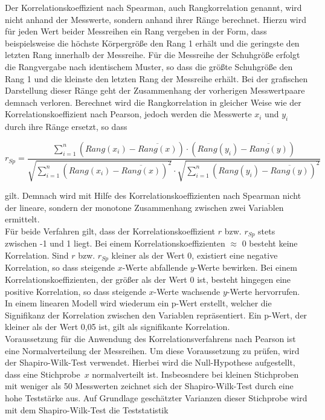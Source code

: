 Der Korrelationskoeffizient nach Spearman, auch Rangkorrelation genannt, wird nicht anhand der Messwerte, sondern anhand ihrer Ränge berechnet. Hierzu wird für jeden Wert beider Messreihen ein Rang vergeben in der Form, dass beispielsweise die höchste Körpergröße den Rang 1 erhält und die geringste den letzten Rang innerhalb der Messreihe. Für die Messreihe der Schuhgröße erfolgt die Rangvergabe nach identischem Muster, so dass die größte Schuhgröße den Rang 1 und die kleinste den letzten Rang der Messreihe erhält. Bei der grafischen Darstellung dieser Ränge geht der Zusammenhang der vorherigen Messwertpaare demnach verloren. Berechnet wird die Rangkorrelation in gleicher Weise wie der Korrelationskoeffizient nach Pearson, jedoch werden die Messwerte $x_i$ und $y_i$ durch ihre Ränge ersetzt, so dass 

\begin{equation}
r_{Sp} =  \frac{\sum \limits_{i=1}^n (Rang(x_i)-\overline{Rang(x)}) \cdot (Rang(y_i)-\overline{Rang(y)})}{\sqrt{\sum \limits_{i=1}^n (Rang(x_i)-\overline{Rang(x)})^2} \cdot \sqrt{\sum \limits_{i=1}^n (Rang(y_i)-\overline{Rang(y)})^2}}
	\label{eq:spearman}
\end{equation}

gilt. Demnach wird mit Hilfe des Korrelationskoeffizienten nach Spearman nicht der lineare, sondern der monotone Zusammenhang zwischen zwei Variablen ermittelt. \parencite{frank_einfach_2006}\\

Für beide Verfahren gilt, dass der Korrelationskoeffizient $r$ bzw. $r_{Sp}$ stets zwischen -1 und 1 liegt. Bei einem Korrelationskoeffizienten $\approx$ 0 besteht keine Korrelation. Sind $r$ bzw. $r_{Sp}$ kleiner als der Wert 0, existiert eine negative Korrelation, so dass steigende $x$-Werte abfallende $y$-Werte bewirken. Bei einem Korrelationskoeffizienten, der größer als der Wert 0 ist, besteht hingegen eine positive Korrelation, so dass steigende $x$-Werte wachsende $y$-Werte hervorrufen. In einem linearen Modell wird wiederum ein p-Wert erstellt, welcher die Signifikanz der Korrelation zwischen den Variablen repräsentiert. Ein p-Wert, der kleiner als der Wert 0,05 ist, gilt als signifikante Korrelation. \parencite{frank_einfach_2006}\\

Voraussetzung für die Anwendung des Korrelationsverfahrens nach Pearson ist eine Normalverteilung der Messreihen. Um diese Voraussetzung zu prüfen, wird der Shapiro-Wilk-Test verwendet. Hierbei wird die Null-Hypothese aufgestellt, dass eine Stichprobe~$x$ normalverteilt ist. Insbeosndere bei kleinen Stichproben mit weniger als 50 Messwerten zeichnet sich der Shapiro-Wilk-Test durch eine hohe Teststärke aus. Auf Grundlage geschätzter Varianzen dieser Stichprobe wird mit dem Shapiro-Wilk-Test die Teststatistik

